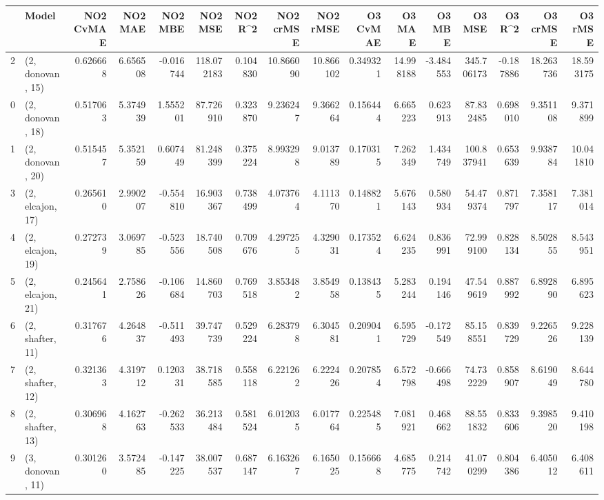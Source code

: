 \begin{tabular}{llrrrrrrrrrrrrrr}
\toprule
{} &             Model &  NO2 CvMAE &   NO2 MAE &   NO2 MBE &     NO2 MSE &   NO2 R\textasciicircum2 &  NO2 crMSE &   NO2 rMSE &  O3 CvMAE &     O3 MAE &    O3 MBE &      O3 MSE &    O3 R\textasciicircum2 &   O3 crMSE &    O3 rMSE \\
\midrule
2  &  (2, donovan, 15) &   0.626668 &  6.656508 & -0.016744 &  118.072183 &  0.104830 &  10.866090 &  10.866102 &  0.349321 &  14.998188 & -3.484553 &  345.706173 & -0.187886 &  18.263736 &  18.593175 \\
0  &  (2, donovan, 18) &   0.517063 &  5.374939 &  1.555201 &   87.726910 &  0.323870 &   9.236247 &   9.366264 &  0.156444 &   6.665223 &  0.623913 &   87.832485 &  0.698010 &   9.351108 &   9.371899 \\
1  &  (2, donovan, 20) &   0.515457 &  5.352159 &  0.607449 &   81.248399 &  0.375224 &   8.993298 &   9.013789 &  0.170315 &   7.262349 &  1.434749 &  100.837941 &  0.653639 &   9.938784 &  10.041810 \\
3  &  (2, elcajon, 17) &   0.265610 &  2.990207 & -0.554810 &   16.903367 &  0.738499 &   4.073764 &   4.111370 &  0.148821 &   5.676143 &  0.580934 &   54.479374 &  0.871797 &   7.358117 &   7.381014 \\
4  &  (2, elcajon, 19) &   0.272739 &  3.069785 & -0.523556 &   18.740508 &  0.709676 &   4.297255 &   4.329031 &  0.173524 &   6.624235 &  0.836991 &   72.999100 &  0.828134 &   8.502855 &   8.543951 \\
5  &  (2, elcajon, 21) &   0.245641 &  2.758626 & -0.106684 &   14.860703 &  0.769518 &   3.853482 &   3.854958 &  0.138435 &   5.283244 &  0.194146 &   47.549619 &  0.887992 &   6.892890 &   6.895623 \\
6  &  (2, shafter, 11) &   0.317676 &  4.264837 & -0.511493 &   39.747739 &  0.529224 &   6.283798 &   6.304581 &  0.209041 &   6.595729 & -0.172549 &   85.158551 &  0.839729 &   9.226526 &   9.228139 \\
7  &  (2, shafter, 12) &   0.321363 &  4.319712 &  0.120331 &   38.718585 &  0.558118 &   6.221262 &   6.222426 &  0.207854 &   6.572798 & -0.666498 &   74.732229 &  0.858907 &   8.619049 &   8.644780 \\
8  &  (2, shafter, 13) &   0.306968 &  4.162763 & -0.262533 &   36.213484 &  0.581524 &   6.012035 &   6.017764 &  0.225485 &   7.081921 &  0.468662 &   88.551832 &  0.833606 &   9.398520 &   9.410198 \\
9  &  (3, donovan, 11) &   0.301260 &  3.572485 & -0.147225 &   38.007537 &  0.687147 &   6.163267 &   6.165025 &  0.156668 &   4.685775 &  0.214742 &   41.070299 &  0.804386 &   6.405012 &   6.408611 \\

\end{tabular}
